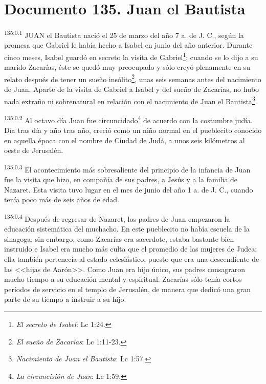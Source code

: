 \chapter{Documento 135. Juan el Bautista}
\par 
\textsuperscript{135:0.1} JUAN el Bautista nació el 25 de marzo del año 7 a. de J. C., según la promesa que Gabriel le había hecho a Isabel en junio del año anterior. Durante cinco meses, Isabel guardó en secreto la visita de Gabriel\footnote{\textit{El secreto de Isabel}: Lc 1:24.}; cuando se lo dijo a su marido Zacarías, éste se quedó muy preocupado y sólo creyó plenamente en su relato después de tener un sueño insólito\footnote{\textit{El sueño de Zacarías}: Lc 1:11-23.}, unas seis semanas antes del nacimiento de Juan. Aparte de la visita de Gabriel a Isabel y del sueño de Zacarías, no hubo nada extraño ni sobrenatural en relación con el nacimiento de Juan el Bautista\footnote{\textit{Nacimiento de Juan el Bautista}: Lc 1:57.}.

\par 
\textsuperscript{135:0.2} Al octavo día Juan fue circuncidado\footnote{\textit{La circuncisión de Juan}: Lc 1:59.} de acuerdo con la costumbre judía. Día tras día y año tras año, creció como un niño normal en el pueblecito conocido en aquella época con el nombre de Ciudad de Judá, a unos seis kilómetros al oeste de Jerusalén.

\par 
\textsuperscript{135:0.3} El acontecimiento más sobresaliente del principio de la infancia de Juan fue la visita que hizo, en compañía de sus padres, a Jesús y a la familia de Nazaret. Esta visita tuvo lugar en el mes de junio del año 1 a. de J. C., cuando tenía poco más de seis años de edad.

\par 
\textsuperscript{135:0.4} Después de regresar de Nazaret, los padres de Juan empezaron la educación sistemática del muchacho. En este pueblecito no había escuela de la sinagoga; sin embargo, como Zacarías era sacerdote, estaba bastante bien instruido e Isabel era mucho más culta que el promedio de las mujeres de Judea; ella también pertenecía al estado eclesiástico, puesto que era una descendiente de las <<hijas de Aarón>>. Como Juan era hijo único, sus padres consagraron mucho tiempo a su educación mental y espiritual. Zacarías sólo tenía cortos períodos de servicio en el templo de Jerusalén, de manera que dedicó una gran parte de su tiempo a instruir a su hijo.

